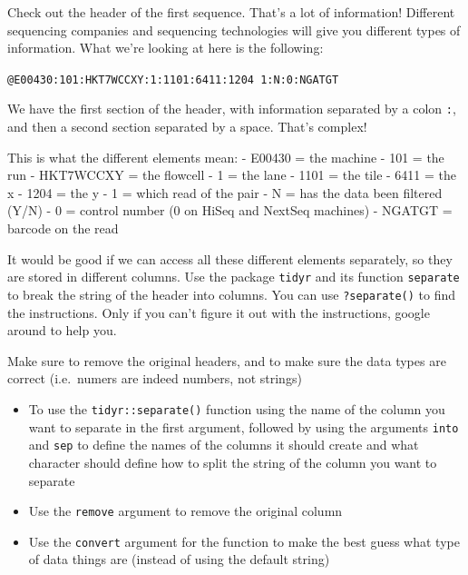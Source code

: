 \documentclass[
  letterpaper,
  DIV=11,
  numbers=noendperiod]{scrreprt}
\providecommand{\tightlist}{%
  \setlength{\itemsep}{0pt}\setlength{\parskip}{0pt}}\usepackage{longtable,booktabs,array}
\begin{document}
Check out the header of the first sequence. That's a lot of information!
Different sequencing companies and sequencing technologies will give you
different types of information. What we're looking at here is the
following:

\texttt{@E00430:101:HKT7WCCXY:1:1101:6411:1204\ 1:N:0:NGATGT}

We have the first section of the header, with information separated by a
colon \texttt{:}, and then a second section separated by a space. That's
complex!

This is what the different elements mean: - E00430 = the machine - 101 =
the run - HKT7WCCXY = the flowcell - 1 = the lane - 1101 = the tile -
6411 = the x - 1204 = the y - 1 = which read of the pair - N = has the
data been filtered (Y/N) - 0 = control number (0 on HiSeq and NextSeq
machines) - NGATGT = barcode on the read

It would be good if we can access all these different elements
separately, so they are stored in different columns. Use the package
\texttt{tidyr} and its function \texttt{separate} to break the string of
the header into columns. You can use \texttt{?separate()} to find the
instructions. Only if you can't figure it out with the instructions,
google around to help you.

Make sure to remove the original headers, and to make sure the data
types are correct (i.e.~numers are indeed numbers, not strings)

\begin{tcolorbox}[enhanced jigsaw, arc=.35mm, left=2mm, titlerule=0mm, rightrule=.15mm, colframe=quarto-callout-tip-color-frame, coltitle=black, colback=white, opacityback=0, bottomtitle=1mm, bottomrule=.15mm, colbacktitle=quarto-callout-tip-color!10!white, breakable, title=\textcolor{quarto-callout-tip-color}{\faLightbulb}\hspace{0.5em}{Tip}, toptitle=1mm, toprule=.15mm, opacitybacktitle=0.6, leftrule=.75mm]

\begin{itemize}
\tightlist
\item
  To use the \texttt{tidyr::separate()} function using the name of the
  column you want to separate in the first argument, followed by using
  the arguments \texttt{into} and \texttt{sep} to define the names of
  the columns it should create and what character should define how to
  split the string of the column you want to separate
\item
  Use the \texttt{remove} argument to remove the original column
\item
  Use the \texttt{convert} argument for the function to make the best
  guess what type of data things are (instead of using the default
  string)
\end{itemize}

\end{tcolorbox}
\end{document}
